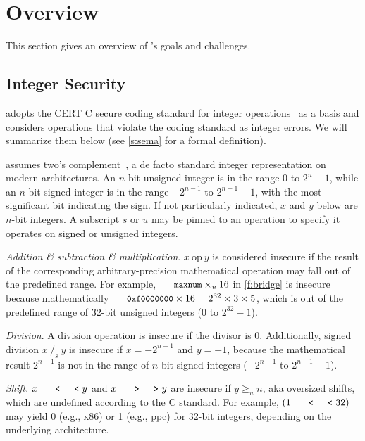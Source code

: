 \section{Overview}
\label{s:oview}

This section gives an overview of \sys's goals and challenges.

\subsection{Integer Security}
\label{s:goal}

\sys adopts the CERT C secure coding standard for integer
operations~\cite[\chapterautorefname~5]{seacord:secure-c} as a basis
and considers operations that violate the coding standard as integer
errors.  We will summarize them below (see \autoref{s:sema} for a
formal definition).

\sys assumes two's complement~\cite[\chapterautorefname~4.2.1]{intel:vol1},
a de facto standard integer representation on modern architectures.
An $n$-bit unsigned integer is in the range $0$ to $2^n-1$, while
an $n$-bit signed integer is in the range $-2^{n-1}$ to $2^{n-1}-1$,
with the most significant bit indicating the sign.  If not particularly
indicated, $x$ and $y$ below are $n$-bit integers.  A subscript $s$
or $u$ may be pinned to an operation to specify it operates on
signed or unsigned integers.

\noindent
{\it Addition \& subtraction \& multiplication}.
$x\ \textrm{op}\ y$ is considered insecure if the result of the
corresponding arbitrary-precision mathematical operation may fall
out of the predefined range.  For example, $\cc{maxnum}\times_u
16$ in \autoref{f:bridge} is insecure because mathematically
$\cc{0xf0000000} \times 16 = 2^{32}\times 3\times 5$, which is out
of the predefined range of $32$-bit unsigned integers ($0$ to $2^{32}
- 1$).

\noindent
{\it Division}.
A division operation is insecure if the divisor is 0.  Additionally,
signed division $x\ /_s\ y$ is insecure if $x = -2^{n-1}$ and $y =
-1$, because the mathematical result $2^{n-1}$ is not in the range
of $n$-bit signed integers ($-2^{n-1}$ to $2^{n-1}-1$).

\noindent
{\it Shift}. $x \shl y$ and $x \shr y$ are insecure if $y \geq_u
n$, aka oversized shifts, which are undefined according to the C
standard.  For example, $(1 \shl 32)$ may yield 0 (e.g., x86) or 1
(e.g., ppc) for 32-bit integers, depending on the underlying
architecture.

